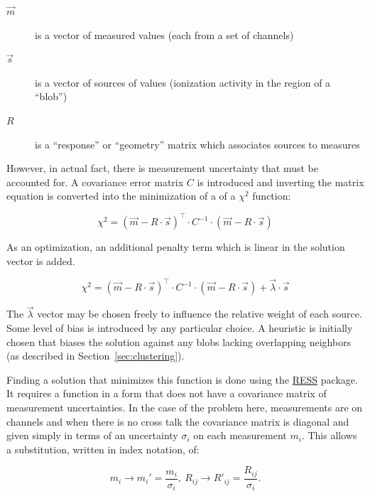 \documentclass[11pt]{article}
\begin{document}
\begin{description}
\item[{\(\vec{m}\)}] is a vector of measured values (each from a set of channels)
\item[{\(\vec{s}\)}] is a vector of sources of values (ionization activity in the region of a ``blob'')
\item[{\(R\)}] is a ``response'' or ``geometry'' matrix which associates sources to measures
\end{description}

\noindent However, in actual fact, there is measurement uncertainty that must be accounted for. 
A covariance error matrix $C$ is introduced and inverting the matrix equation is converted into the minimization of a of a $\chi^2$ function:

\begin{equation}
\chi^2 = (\vec{m} - R\cdot\vec{s})^\intercal \cdot C^{-1} \cdot (\vec{m} - R\cdot\vec{s})
\end{equation}

\noindent As an optimization, an additional penalty term which is linear in the solution vector is added.

\begin{equation}
\label{eq:solving}
\chi^2 = (\vec{m} - R\cdot\vec{s})^\intercal \cdot C^{-1} \cdot (\vec{m} - R\cdot\vec{s}) + \vec{\lambda}\cdot \vec{s}
\end{equation}


\noindent The $\vec{\lambda}$ vector may be chosen freely to influence the relative weight of each source.  Some level of bias is introduced by any particular choice.  A heuristic is initially chosen that biases the solution against any blobs lacking overlapping neighbors (as described in Section~\ref{sec:clustering}).

Finding a solution that minimizes this function is done using the \href{https://github.com/wirecell/wire-cell-ress}{RESS} package.  It requires a function in a form that does not have a covariance matrix of measurement uncertainties.  In the case of the problem here, measurements are on channels and when there is no cross talk the covariance matrix is diagonal and given simply in terms of an uncertainty $\sigma_i$ on each measurement $m_i$.  This allows a substitution, written in index notation, of:

\begin{equation}
  m_i \to m_i' = \frac{m_i}{\sigma_i},\  R_{ij} \to R'_{ij} = \frac{R_{ij}}{\sigma_i}.
\end{equation}
\end{document}
